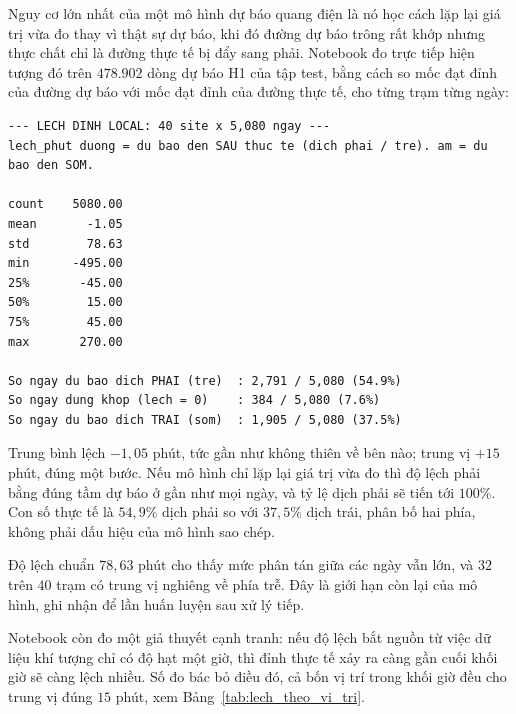 Nguy cơ lớn nhất của một mô hình dự báo quang điện là nó học cách lặp lại giá trị vừa đo thay
vì thật sự dự báo, khi đó đường dự báo trông rất khớp nhưng thực chất chỉ là đường thực tế
bị đẩy sang phải. Notebook  đo trực tiếp hiện tượng đó trên
$478.902$ dòng dự báo H1 của tập test, bằng cách so mốc đạt đỉnh của đường dự báo với mốc đạt
đỉnh của đường thực tế, cho từng trạm từng ngày:

\begingroup
\par{}\vspace{8pt}
\scriptsize\renewcommand{\baselinestretch}{1.0}\selectfont
\begin{verbatim}
--- LECH DINH LOCAL: 40 site x 5,080 ngay ---
lech_phut duong = du bao den SAU thuc te (dich phai / tre). am = du bao den SOM.

count    5080.00
mean       -1.05
std        78.63
min      -495.00
25%       -45.00
50%        15.00
75%        45.00
max       270.00

So ngay du bao dich PHAI (tre)  : 2,791 / 5,080 (54.9%)
So ngay dung khop (lech = 0)    : 384 / 5,080 (7.6%)
So ngay du bao dich TRAI (som)  : 1,905 / 5,080 (37.5%)
\end{verbatim}
\par\vspace{8pt}
\endgroup
Trung bình lệch $-1{,}05$ phút, tức gần như không thiên về bên nào; trung vị $+15$ phút, đúng
một bước. Nếu mô hình chỉ lặp lại giá trị vừa đo thì độ lệch phải bằng đúng tầm dự báo ở gần
như mọi ngày, và tỷ lệ dịch phải sẽ tiến tới $100\%$. Con số thực tế là $54{,}9\%$ dịch phải so
với $37{,}5\%$ dịch trái, phân bố hai phía, không phải dấu hiệu của mô hình sao chép.

Độ lệch chuẩn $78{,}63$ phút cho thấy mức phân tán giữa các ngày vẫn lớn, và $32$ trên $40$
trạm có trung vị nghiêng về phía trễ. Đây là giới hạn còn lại của mô hình, ghi nhận để lần huấn
luyện sau xử lý tiếp.

Notebook còn đo một giả thuyết cạnh tranh: nếu độ lệch bắt nguồn từ việc dữ liệu khí tượng chỉ
có độ hạt một giờ, thì đỉnh thực tế xảy ra càng gần cuối khối giờ sẽ càng lệch nhiều.
Số đo bác bỏ điều đó, cả bốn vị trí trong khối giờ đều cho trung vị đúng $15$ phút, xem Bảng~\ref{tab:lech_theo_vi_tri}.

